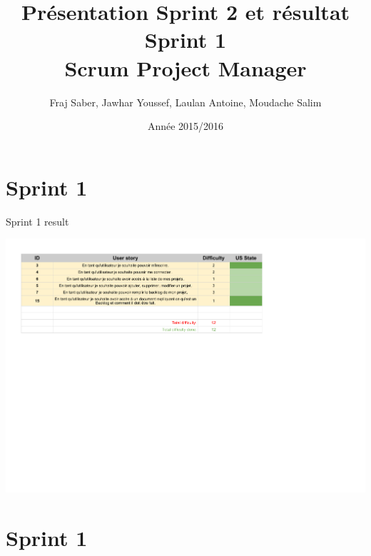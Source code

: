 \documentclass{beamer}
\title{}
\title{Présentation Sprint 2 et résultat Sprint 1 \\ Scrum Project Manager}
\author{Fraj Saber, Jawhar Youssef, Laulan Antoine, Moudache Salim}
\institute{Université de Bordeaux}
\date{Année 2015/2016}
\begin{document}


\begin{frame}
    \titlepage
\end{frame}



\section{Sprint 1}

\begin{frame}{Sprint 1 result}
	\begin{center}
        \includegraphics[scale=0.55]{Sprint1.pdf}
        \end{center}
\end{frame}

\section{Sprint 1}
\end{document}
